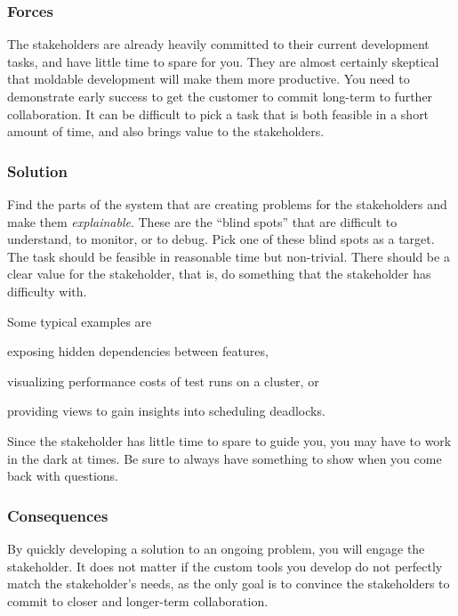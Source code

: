 \documentclass[sigconf]{acmart}
\renewcommand{\nbc}[3]{} %
\newcommand\eog[1]{\nbc{Edward}{#1}{purple}}
\begin{document}
\subsubsection*{Forces}
The stakeholders are already heavily committed to their current development tasks, and have little time to spare for you.
They are almost certainly skeptical that moldable development will make them more productive.
You need to demonstrate early success to get the customer to commit long-term to further collaboration.
It can be difficult to pick a task that is both feasible in a short amount of time, and also brings value to the stakeholders.

\subsubsection*{Solution}
Find the parts of the system that are creating problems for the stakeholders and make them \emph{explainable}.
These are the ``blind spots'' that are difficult to understand, to monitor, or to debug.
Pick one of these blind spots as a target.
The task should be feasible in reasonable time but non-trivial.
There should be a clear value for the stakeholder, that is, do something that the stakeholder has difficulty with.

\eog{I really like this blind spot pattern. pointing out things that are difficult to understand modern debug. I almost want to like, say this is another like first place that we should talk about. You do that. I just wonder like should we like lift this further up in the paper or talk about it first?}

Some typical examples are 
\begin{inparaenum}[(i)]
\item exposing hidden dependencies between features, 
\item visualizing performance costs of test runs on a cluster, or
\item providing views to gain insights into scheduling deadlocks.
\end{inparaenum}

Since the stakeholder has little time to spare to guide you, you may have to work in the dark at times.
Be sure to always have something to show when you come back with questions.

\subsubsection*{Consequences}
By quickly developing a solution to an ongoing problem, you will engage the stakeholder.
It does not matter if the custom tools you develop do not perfectly match the stakeholder's needs, as the only goal is to convince the stakeholders to commit to closer and longer-term collaboration.
\end{document}
